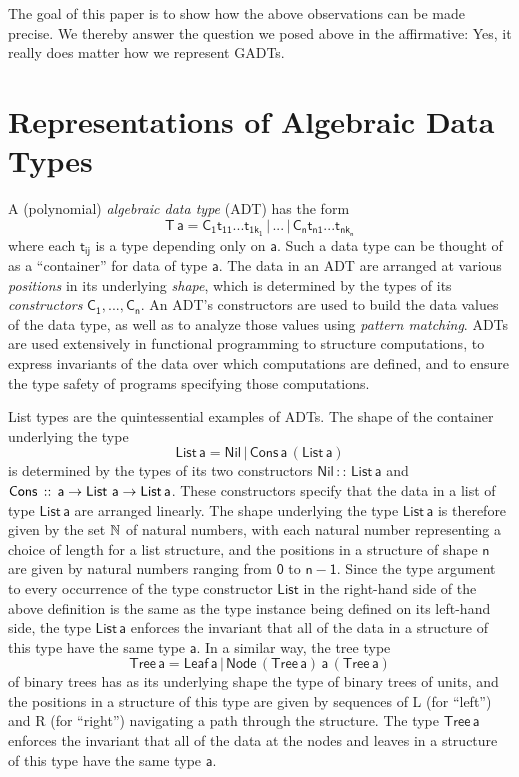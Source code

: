 \documentclass[submission,copyright,creativecommons]{eptcs}
\begin{document}
The goal of this paper is to show how the above observations can be
made precise. We thereby answer the question we posed above in the
affirmative: Yes, it really does matter how we represent GADTs.

\section{Representations of Algebraic Data Types}\label{sec:adts}

A (polynomial) {\em algebraic data type} (ADT) has the form
\[\mathsf{T\,a} = \mathsf{C_1 t_{11}}...\mathsf{t_{1k_1}}\, |\, ...\, |\,
\mathsf{C_n t_{n1}}...\mathsf{t_{nk_n}}\] where each $\mathsf{t_{ij}}$
is a type depending only on $\mathsf{a}$. Such a data type can be
thought of as a ``container'' for data of type $\mathsf{a}$. The data
in an ADT are arranged at various {\em positions} in its underlying
{\em shape}, which is determined by the types of its {\em
  constructors} $\mathsf{C_1},...,\mathsf{C_n}$. An ADT's constructors
are used to build the data values of the data type, as well as to
analyze those values using {\em pattern matching}. ADTs are used
extensively in functional programming to structure computations, to
express invariants of the data over which computations are defined,
and to ensure the type safety of programs specifying those
computations.

List types are the quintessential examples of ADTs. The shape of the
container underlying the
type
\[\mathsf{List\,a} = \mathsf{Nil} \,|\, \mathsf{Cons\,a\,(List\,a)}\]
is determined by the types of its two constructors $\mathsf{Nil\, ::\,
  List\, a}$ and $\mathsf{Cons \,::\,a \to \mathsf{List}\,\,a\to
  List\,a}$. These constructors specify that the data in a list of
type $\mathsf{List\,a}$ are arranged linearly. The shape underlying
the type $\mathsf{List\,a}$ is therefore given by the set $\mathbb{N}$ of
natural numbers, with each natural number representing a choice of
length for a list structure, and the positions in a structure of shape
$\mathsf{n}$ are given by natural numbers ranging from $\mathsf{0}$ to
$\mathsf{n-1}$. Since the type argument to every occurrence of the
type constructor $\mathsf{List}$ in the right-hand side of the above
definition is the same as the type instance being defined on its
left-hand side, the type $\mathsf{List\,a}$ enforces the invariant
that all of the data in a structure of this type have the same type
$\mathsf{a}$. In a similar way, the tree type
\[\mathsf{Tree\, a} = \mathsf{Leaf\,a}
\,|\,\mathsf{Node\,(Tree\,a)\,a\,(Tree\,a)}\] of binary trees has as
its underlying shape the type of binary trees of units, and the
positions in a structure of this type are given by sequences of L (for
``left'') and R (for ``right'') navigating a path through the
structure. The type $\mathsf{Tree\, a}$ enforces the invariant that
all of the data at the nodes and leaves in a structure of this type
have the same type $\mathsf{a}$.
\end{document}
